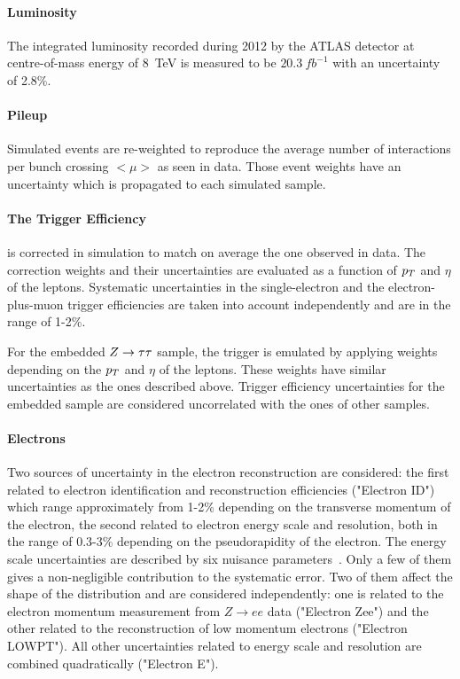 \paragraph{Luminosity}
The integrated luminosity recorded during 2012 by the ATLAS detector at centre-of-mass energy of 8~TeV is measured 
to be $20.3 ~ fb^{-1}$ \cite{luminosity} with an uncertainty  of  2.8\%.

\paragraph{Pileup}
Simulated events are re-weighted to reproduce the average number of interactions per bunch crossing $<\mu>$ as seen in data. 
Those event weights have an uncertainty which is propagated to each simulated sample.

\paragraph{The Trigger Efficiency}
is corrected in simulation to match on  average the one observed in data. The correction weights and their uncertainties 
are evaluated as a function of $p_{T}$ and $\eta$ of the leptons. 
Systematic uncertainties in the single-electron and the electron-plus-muon trigger efficiencies are taken into account 
independently and are in the range of 1-2\%.

For the embedded $Z\rightarrow \tau\tau$ sample, the trigger is emulated by applying weights  depending on the  $p_{T}$ and $\eta$ of the leptons. 
These weights  have similar uncertainties as the ones described above. Trigger efficiency uncertainties for the embedded sample 
 are considered uncorrelated with the ones of other samples.

\paragraph{Electrons}
Two sources of uncertainty in the electron reconstruction are considered:
the first  related to electron identification and reconstruction efficiencies ("Electron ID") which range approximately from 1-2\%
depending on the transverse momentum of the electron, 
the second related to electron energy scale  and resolution, both in the range of 0.3-3\% depending on the pseudorapidity of the electron. 
The energy scale uncertainties are described by six nuisance parameters~\cite{eleEnergy}.
Only a few of them gives a non-negligible contribution to the systematic error. Two of them 
affect the shape of the \mmc distribution and are considered independently: one is related to the electron  
momentum measurement from  $Z \rightarrow ee$ data ("Electron Zee") 
and the other related to the reconstruction of low momentum electrons ("Electron LOWPT"). 
All other uncertainties related to energy scale and resolution are combined quadratically ("Electron E").

